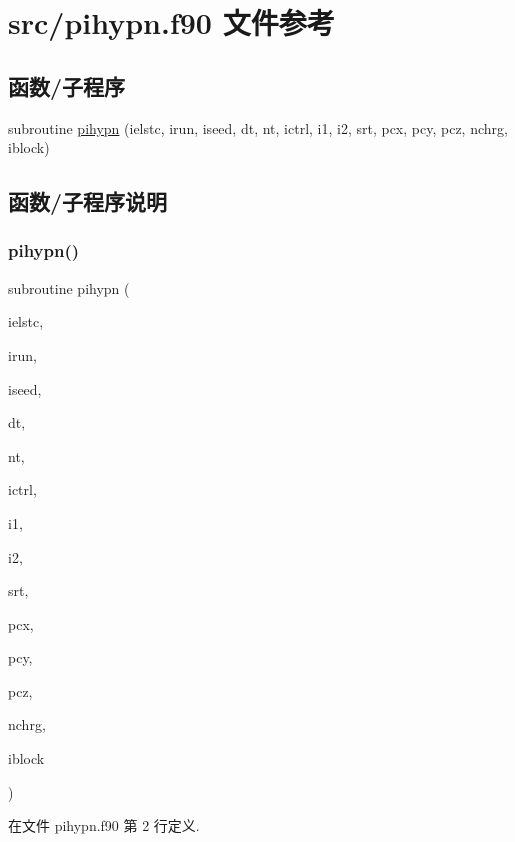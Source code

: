 \hypertarget{pihypn_8f90}{}\section{src/pihypn.f90 文件参考}
\label{pihypn_8f90}
\subsection*{函数/子程序}
\begin{DoxyCompactItemize}
\item 
subroutine \mbox{\hyperlink{pihypn_8f90_ab94d6dcca38149f15f71a65c8a8afcd3}{pihypn}} (ielstc, irun, iseed, dt, nt, ictrl, i1, i2, srt, pcx, pcy, pcz, nchrg, iblock)
\end{DoxyCompactItemize}


\subsection{函数/子程序说明}
\mbox{\label{pihypn_8f90_ab94d6dcca38149f15f71a65c8a8afcd3}} 
\subsubsection{\texorpdfstring{pihypn()}{pihypn()}}
{\footnotesize\ttfamily subroutine pihypn (\begin{DoxyParamCaption}\item[{}]{ielstc,  }\item[{}]{irun,  }\item[{}]{iseed,  }\item[{}]{dt,  }\item[{}]{nt,  }\item[{}]{ictrl,  }\item[{}]{i1,  }\item[{}]{i2,  }\item[{}]{srt,  }\item[{}]{pcx,  }\item[{}]{pcy,  }\item[{}]{pcz,  }\item[{}]{nchrg,  }\item[{}]{iblock }\end{DoxyParamCaption})}



在文件 pihypn.\+f90 第 2 行定义.


